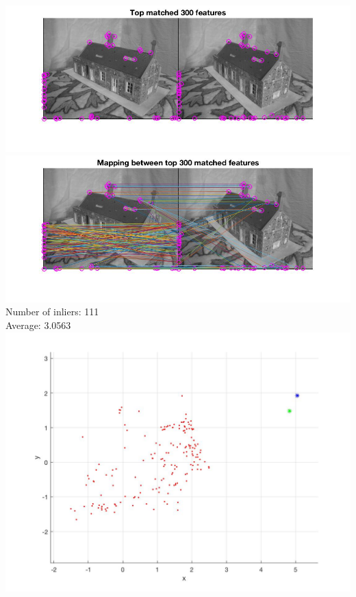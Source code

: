 \documentclass[a4paper,11pt]{article}
\begin{document}
\includegraphics[width=\textwidth]{hw3/data/part2/4_2}\\
\includegraphics[width=\textwidth]{hw3/data/part2/4_3}\\


Number of inliers: 111\\

Average: 3.0563\\
\includegraphics[width=\textwidth]{hw3/data/part2/5}\\
\vfill
\end{document}
